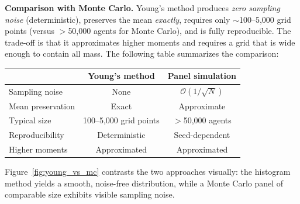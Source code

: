 \documentclass[11pt,a4paper]{report}
\begin{document}
\medskip\noindent\textbf{Comparison with Monte Carlo.}
Young's method produces \emph{zero sampling noise} (deterministic), preserves the mean \emph{exactly}, requires only $\sim$100--5,000 grid points (versus $>$50,000 agents for Monte Carlo), and is fully reproducible.  The trade-off is that it approximates higher moments and requires a grid that is wide enough to contain all mass.  The following table summarizes the comparison:
\begin{center}
\small
\begin{tabular}{lcc}
\toprule
& \textbf{Young's method} & \textbf{Panel simulation} \\
\midrule
Sampling noise & None & $\mathcal{O}(1/\sqrt{N})$ \\
Mean preservation & Exact & Approximate \\
Typical size & 100--5,000 grid points & $>$50,000 agents \\
Reproducibility & Deterministic & Seed-dependent \\
Higher moments & Approximated & Approximated \\
\bottomrule
\end{tabular}
\end{center}
Figure~\ref{fig:young_vs_mc} contrasts the two approaches visually: the histogram method yields a smooth, noise-free distribution, while a Monte Carlo panel of comparable size exhibits visible sampling noise.
\end{document}
